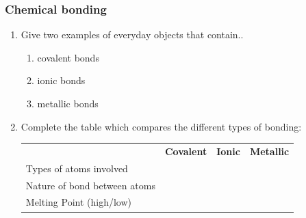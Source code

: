             \subsubsection{  Chemical bonding
        }
            \nopagebreak
        \label{m38694*id143111}\begin{enumerate}[noitemsep, label=\textbf{\arabic*}. ] 
            \label{m38694*uid86}\item Give two examples of everyday objects that contain..
\label{m38694*id143127}\begin{enumerate}[noitemsep, label=\textbf{\alph*}. ] 
            \label{m38694*uid87}\item covalent bonds
\label{m38694*uid88}\item ionic bonds
\label{m38694*uid89}\item metallic bonds
\end{enumerate}
                \label{m38694*uid90}\item Complete the table which compares the different types of bonding:
          \begin{table}[H]
        \begin{center}
      \label{m38694*id143180}
    \noindent
      \tablelasttail{}
      \begin{xtabular}[t]{|l|l|l|l|}\hline
         &
        \textbf{Covalent} &
        \textbf{Ionic} &
        \textbf{Metallic}%
     \tabularnewline{}
        Types of atoms involved &
         &
         &
     \tabularnewline{}
        Nature of bond between atoms &
         &
         &
     \tabularnewline{}
        Melting Point (high/low) &
         &
         &
     \tabularnewline{}

\end{xtabular}
\end{center}
\end{table}
\end{enumerate}
